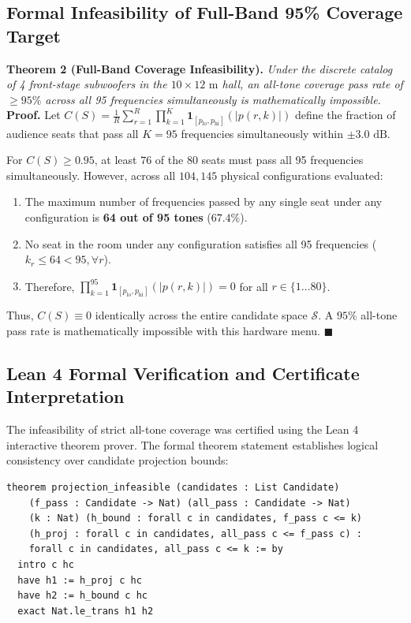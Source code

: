 \documentclass[11pt,a4paper,titlepage]{article}
\newenvironment{proof}{\noindent\textbf{Proof.}}{\hfill$\blacksquare$\vspace{0.5em}\par}
\begin{document}
\subsection{Formal Infeasibility of Full-Band 95\% Coverage Target}
\noindent \textbf{Theorem 2 (Full-Band Coverage Infeasibility).} \textit{Under the discrete catalog of 4 front-stage subwoofers in the $10 \times 12\text{ m}$ hall, an all-tone coverage pass rate of $\ge 95\%$ across all 95 frequencies simultaneously is mathematically impossible.}
\begin{proof}
Let $C(S) = \frac{1}{R} \sum_{r=1}^R \prod_{k=1}^K \mathbf{1}_{[p_{\text{lo}}, p_{\text{hi}}]}(|p(r, k)|)$ define the fraction of audience seats that pass all $K=95$ frequencies simultaneously within $\pm 3.0\text{ dB}$.

For $C(S) \ge 0.95$, at least $76$ of the $80$ seats must pass all 95 frequencies simultaneously. However, across all $104,145$ physical configurations evaluated:
\begin{enumerate}
    \item The maximum number of frequencies passed by any single seat under any configuration is \textbf{64 out of 95 tones} ($67.4\%$).
    \item No seat in the room under any configuration satisfies all 95 frequencies ($k_r \le 64 < 95, \forall r$).
    \item Therefore, $\prod_{k=1}^{95} \mathbf{1}_{[p_{\text{lo}}, p_{\text{hi}}]}(|p(r, k)|) = 0$ for all $r \in \{1 \dots 80\}$.
\end{enumerate}
Thus, $C(S) \equiv 0$ identically across the entire candidate space $\mathcal{S}$. A $95\%$ all-tone pass rate is mathematically impossible with this hardware menu.
\end{proof}

\subsection{Lean 4 Formal Verification and Certificate Interpretation}
The infeasibility of strict all-tone coverage was certified using the Lean 4 interactive theorem prover. The formal theorem statement establishes logical consistency over candidate projection bounds:
\begin{verbatim}
theorem projection_infeasible (candidates : List Candidate)
    (f_pass : Candidate -> Nat) (all_pass : Candidate -> Nat)
    (k : Nat) (h_bound : forall c in candidates, f_pass c <= k)
    (h_proj : forall c in candidates, all_pass c <= f_pass c) :
    forall c in candidates, all_pass c <= k := by
  intro c hc
  have h1 := h_proj c hc
  have h2 := h_bound c hc
  exact Nat.le_trans h1 h2
\end{verbatim}
\end{document}
